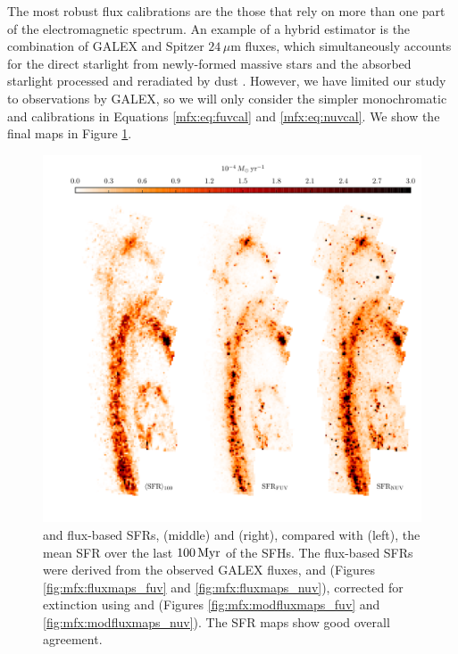 The most robust flux calibrations are the those that rely on more than one part
of the electromagnetic spectrum. An example of a hybrid estimator is the
combination of GALEX \fuv{} and Spitzer $24\,\mu\mathrm{m}$ fluxes, which
simultaneously accounts for the direct starlight from newly-formed massive
stars and the absorbed starlight processed and reradiated by dust
\citep[e.g.,][]{Leroy:2012}. However, we have limited our study to observations
by GALEX, so we will only consider the simpler monochromatic \fuv{} and \nuv{}
calibrations in Equations \ref{mfx:eq:fuvcal} and \ref{mfx:eq:nuvcal}. We show
the final \sfrx{} maps in Figure \ref{fig:mfx:sfrmaps1}.


\begin{figure}
\centering
\includegraphics[width=\textwidth]{m31flux-figures/sfrmaps1.pdf}
\caption[SFR maps from estimates based on observed fluxes compared with the
    mean SFR map from the SFHs.]{\fuv{} and \nuv{} flux-based SFRs, \sfrfuv{}
    (middle) and \sfrnuv{} (right), compared with \sfroneh{} (left), the mean
    SFR over the last $100\,\mathrm{Myr}$ of the SFHs. The flux-based SFRs were derived
    from the observed GALEX fluxes, \fuvobs{} and \nuvobs{} (Figures
    \ref{fig:mfx:fluxmaps_fuv} and \ref{fig:mfx:fluxmaps_nuv}), corrected for
    extinction using \afuv{} and \anuv{} (Figures \ref{fig:mfx:modfluxmaps_fuv}
    and \ref{fig:mfx:modfluxmaps_nuv}). The SFR maps show good overall
    agreement.
}
\label{fig:mfx:sfrmaps1}
\end{figure}



